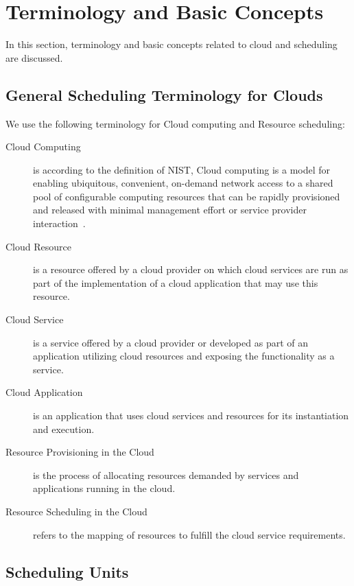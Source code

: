 \documentclass[final,5p,times,twocolumn]{elsarticle}
\begin{document}
\section{Terminology and Basic Concepts}\label{sec:terminology}

In this section, terminology and basic concepts related to cloud and
scheduling are discussed.

\subsection{General Scheduling Terminology for Clouds}

We use the following terminology for Cloud computing and Resource scheduling:

\begin{description}

\item[Cloud Computing] is according to the definition of NIST, Cloud computing
  is a model for enabling ubiquitous, convenient, on-demand network
  access to a shared pool of configurable computing resources that can
  be rapidly provisioned and released with minimal management effort
  or service provider interaction~\cite{mell2011nist}.

\item[Cloud Resource] is a resource offered by a cloud provider on
  which cloud services are run as part of the implementation of a
  cloud application that may use this resource.

\item[Cloud Service] is a service offered by a cloud provider or
  developed as part of an application utilizing cloud resources and
  exposing the functionality as a service.
  
\item[Cloud Application] is an application that uses cloud services
  and resources for its instantiation and execution.

\item [Resource Provisioning in the Cloud] is the process of allocating 
  resources demanded by services and applications running in the cloud.
  
\item [Resource Scheduling in the Cloud] refers to the mapping of
  resources to fulfill the cloud service requirements.

\end{description}


\subsection{Scheduling Units}
\end{document}
